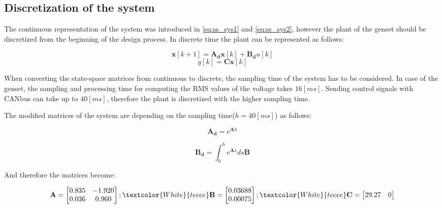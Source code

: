 \subsection{Discretization of the system}
\label{discrete}

The continuous representation of the system was introduced in \eqref{eq:ss_sys1} and \eqref{eq:ss_sys2}, however the plant of the genset should be discretized from the beginning of the design process. In discrete time the plant can be represented as follows: 

\begin{equation}
  \label{eq:ss_sys1_d}
    \mathbf{x}[k+1] = \mathbf{A_d} \mathbf{x}[k] + \mathbf{B_d} u[k]
  \end{equation}
\begin{equation}
  \label{eq:ss_sys2_d}
    y[k] = \mathbf{C} \mathbf{x}[k]
  \end{equation}
  
When converting the state-space matrices from continuous to discrete, the sampling time of the system has to be considered. In case of the genset, the sampling and processing time for computing the RMS values of the voltage takes $16 [ms]$. Sending control signals with CANbus can take up to $40 [ms]$, therefore the plant is discretized with the higher sampling time. 

The modified matrices of the system are depending on the sampling time($h = 40 [ms]$) as follows:

\begin{equation}
  \label{eq:Ad}
    \mathbf{A_d} = e^{\mathbf{A}h}  
  \end{equation}

\begin{equation}
  \label{eq:Bd}
    \mathbf{B_d} = \int_{0}^{h} e^{\mathbf{A}s}ds\mathbf{B}
  \end{equation}

And therefore the matrices become: 

 \begin{equation}
  \label{eq:system_matrices_}
	\mathbf{A}
	 =   
    \begin{bmatrix}
    0.835 & -1.920 \\
     0.036 & 0.960
\end{bmatrix}
;
\textcolor{White}{teeee}
\mathbf{B}
	 =   
    \begin{bmatrix}
    0.03688 \\
    0.00075
\end{bmatrix}
;
\textcolor{White}{teeee}
\mathbf{C}
	 =   
    \begin{bmatrix}
    29.27 & 0
\end{bmatrix}
  \end{equation}